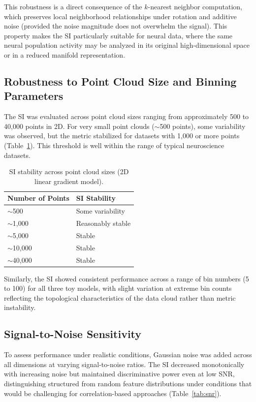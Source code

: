 \documentclass[12pt]{article}
\begin{document}
This robustness is a direct consequence of the $k$-nearest neighbor computation, which preserves local neighborhood relationships under rotation and additive noise (provided the noise magnitude does not overwhelm the signal). This property makes the SI particularly suitable for neural data, where the same neural population activity may be analyzed in its original high-dimensional space or in a reduced manifold representation.

\subsection{Robustness to Point Cloud Size and Binning Parameters}

The SI was evaluated across point cloud sizes ranging from approximately 500 to 40,000 points in 2D. For very small point clouds ($\sim$500 points), some variability was observed, but the metric stabilized for datasets with 1,000 or more points (Table~\ref{tab:cloud_size}). This threshold is well within the range of typical neuroscience datasets.

\begin{table}[htbp]
\centering
\caption{SI stability across point cloud sizes (2D linear gradient model).}
\label{tab:cloud_size}
\begin{tabular}{ll}
\toprule
Number of Points & SI Stability \\
\midrule
$\sim$500 & Some variability \\
$\sim$1,000 & Reasonably stable \\
$\sim$5,000 & Stable \\
$\sim$10,000 & Stable \\
$\sim$40,000 & Stable \\
\bottomrule
\end{tabular}
\end{table}

Similarly, the SI showed consistent performance across a range of bin numbers (5 to 100) for all three toy models, with slight variation at extreme bin counts reflecting the topological characteristics of the data cloud rather than metric instability.

\subsection{Signal-to-Noise Sensitivity}

To assess performance under realistic conditions, Gaussian noise was added across all dimensions at varying signal-to-noise ratios. The SI decreased monotonically with increasing noise but maintained discriminative power even at low SNR, distinguishing structured from random feature distributions under conditions that would be challenging for correlation-based approaches (Table~\ref{tab:snr}).
\end{document}
